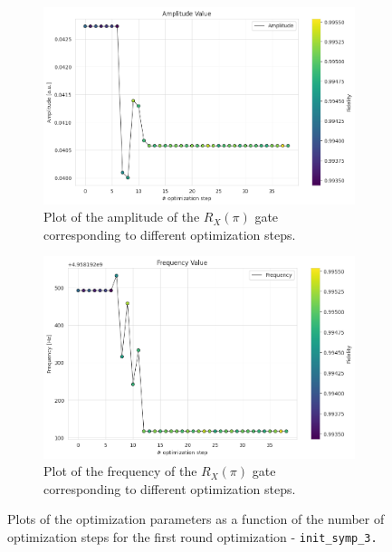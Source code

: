 \begin{figure}[h!]
    \centering
    \begin{subfigure}[t]{0.45\textwidth}
        \includegraphics[width=\textwidth]{figures/png/RB_optimization/NM/InitialSymplex/20241113_200745/Amplitude.png}
        \caption{Plot of the amplitude of the $R_X(\pi)$ gate corresponding to different optimization steps.}
        \label{fig:20241113_200745:amplitude}
    \end{subfigure}
    \hfill
    \begin{subfigure}[t]{0.45\textwidth}
        \includegraphics[width=\textwidth]{figures/png/RB_optimization/NM/InitialSymplex/20241113_200745/Frequency.png}
        \caption{Plot of the frequency of the $R_X(\pi)$ gate corresponding to different optimization steps.}
        \label{fig:20241113_200745:frequency}
    \end{subfigure}
    \caption{Plots of the optimization parameters as a function of the number of optimization steps for the first round optimization - \tt{init\_symp\_3}.}
    \label{fig:20241113_200745:parameters}
\end{figure}

